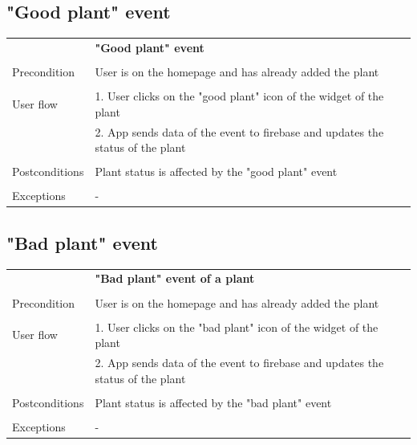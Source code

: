 \documentclass[10pt]{article}
\begin{document}
    \subsection{"Good plant" event}
    \begin{tabular}{ p{3cm}|p{8cm} }
     & \textbf{"Good plant" event} \\
     \\
     Precondition & User is on the homepage and has already added the plant \\ 
     \\
     User flow 
     & 1. User clicks on the "good plant" icon of the widget of the plant \\
     & 2. App sends data of the event to firebase and updates the status of the plant \\ 
     \\
     Postconditions & Plant status is affected by the "good plant" event \\
     \\
     Exceptions & -\\
    \end{tabular}
    \newline
    \newline
    \newline
    \subsection{"Bad plant" event}
    \begin{tabular}{ p{3cm}|p{8cm} }
     & \textbf{"Bad plant" event of a plant} \\
     \\
     Precondition & User is on the homepage and has already added the plant \\ 
     \\
     User flow 
     & 1. User clicks on the "bad plant" icon of the widget of the plant \\
     & 2. App sends data of the event to firebase and updates the status of the plant \\ 
     \\
     Postconditions & Plant status is affected by the "bad plant" event \\
     \\
     Exceptions & -\\
    \end{tabular}
    \newline
    \newline
    \newline
\end{document}
